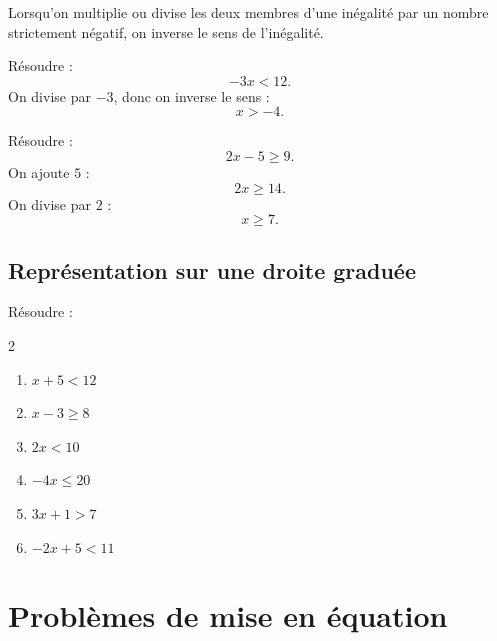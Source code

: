 \documentclass[11pt,a4paper]{article}
\newcounter{exercice}
\begin{document}
\begin{propriete}
Lorsqu'on multiplie ou divise les deux membres d'une inégalité par un nombre strictement négatif, on inverse le sens de l'inégalité.
\end{propriete}

\begin{exemple}
Résoudre :
\[
-3x<12.
\]
On divise par $-3$, donc on inverse le sens :
\[
x>-4.
\]
\end{exemple}

\begin{exemple}
Résoudre :
\[
2x-5\geq9.
\]
On ajoute $5$ :
\[
2x\geq14.
\]
On divise par $2$ :
\[
x\geq7.
\]
\end{exemple}

\subsection{Représentation sur une droite graduée}

\begin{center}
\end{center}

\begin{exercice}
Résoudre :
\begin{multicols}{2}
\begin{enumerate}[label=\alph*)]
  \item $x+5<12$
  \item $x-3\geq 8$
  \item $2x<10$
  \item $-4x\leq 20$
  \item $3x+1>7$
  \item $-2x+5<11$
\end{enumerate}
\end{multicols}
\end{exercice}

\newpage

\section{Problèmes de mise en équation}
\end{document}

